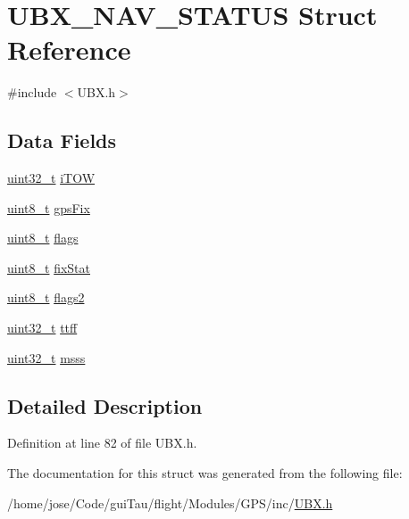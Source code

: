 \hypertarget{struct_u_b_x___n_a_v___s_t_a_t_u_s}{\section{U\-B\-X\-\_\-\-N\-A\-V\-\_\-\-S\-T\-A\-T\-U\-S Struct Reference}
\label{struct_u_b_x___n_a_v___s_t_a_t_u_s}
}


{\ttfamily \#include $<$U\-B\-X.\-h$>$}

\subsection*{Data Fields}
\begin{DoxyCompactItemize}
\item 
\hyperlink{stdint_8h_a435d1572bf3f880d55459d9805097f62}{uint32\-\_\-t} \hyperlink{group___g_s_p_module_ga8413a77f5cf599f1d89fce98a304c5c1}{i\-T\-O\-W}
\item 
\hyperlink{stdint_8h_aba7bc1797add20fe3efdf37ced1182c5}{uint8\-\_\-t} \hyperlink{group___g_s_p_module_ga9ada0b00d91062449f398439afec8e70}{gps\-Fix}
\item 
\hyperlink{stdint_8h_aba7bc1797add20fe3efdf37ced1182c5}{uint8\-\_\-t} \hyperlink{group___g_s_p_module_ga06eed2ab154f7ab69c8a5f5acfbae99c}{flags}
\item 
\hyperlink{stdint_8h_aba7bc1797add20fe3efdf37ced1182c5}{uint8\-\_\-t} \hyperlink{group___g_s_p_module_ga6c2f59170b7d3a57f1ce01120b735ed1}{fix\-Stat}
\item 
\hyperlink{stdint_8h_aba7bc1797add20fe3efdf37ced1182c5}{uint8\-\_\-t} \hyperlink{group___g_s_p_module_ga3e1ce741856096d697c3aafd6e66ac61}{flags2}
\item 
\hyperlink{stdint_8h_a435d1572bf3f880d55459d9805097f62}{uint32\-\_\-t} \hyperlink{group___g_s_p_module_ga9810462abcdcce5e305e41d4d6526699}{ttff}
\item 
\hyperlink{stdint_8h_a435d1572bf3f880d55459d9805097f62}{uint32\-\_\-t} \hyperlink{group___g_s_p_module_ga41de8d3154dd215b93adeebff5a7972c}{msss}
\end{DoxyCompactItemize}


\subsection{Detailed Description}


Definition at line 82 of file U\-B\-X.\-h.



The documentation for this struct was generated from the following file\-:\begin{DoxyCompactItemize}
\item 
/home/jose/\-Code/gui\-Tau/flight/\-Modules/\-G\-P\-S/inc/\hyperlink{_u_b_x_8h}{U\-B\-X.\-h}\end{DoxyCompactItemize}
